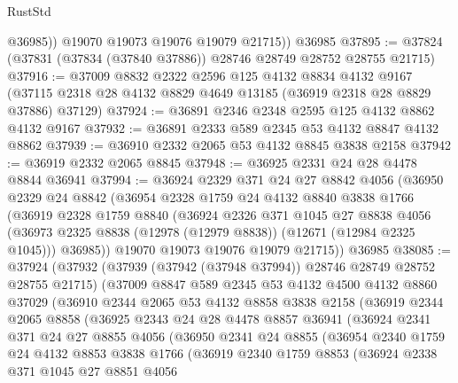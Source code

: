 \begin{lexlean}{RustStd}
\begin{coremodule}
            @36985))
        @19070
        @19073
        @19076
        @19079
        @21715))
    @36985
@37895 := @37824 (@37831 (@37834 (@37840 @37886)) @28746 @28749 @28752 @28755 @21715)
@37916 := @37009
    @8832
    @2322
    @2596
    @125
    @4132
    @8834
    @4132
    @9167
    (@37115 @2318 @28 @4132 @8829 @4649 @13185 (@36919 @2318 @28 @8829 @37886) @37129)
@37924 := @36891 @2346 @2348 @2595 @125 @4132 @8862 @4132 @9167
@37932 := @36891 @2333 @589 @2345 @53 @4132 @8847 @4132 @8862
@37939 := @36910 @2332 @2065 @53 @4132 @8845 @3838 @2158
@37942 := @36919 @2332 @2065 @8845
@37948 := @36925 @2331 @24 @28 @4478 @8844 @36941
@37994 := @36924
    @2329
    @371
    @24
    @27
    @8842
    @4056
    (@36950
      @2329
      @24
      @8842
      (@36954
        @2328
        @1759
        @24
        @4132
        @8840
        @3838
        @1766
        (@36919
          @2328
          @1759
          @8840
          (@36924
            @2326
            @371
            @1045
            @27
            @8838
            @4056
            (@36973 @2325 @8838 (@12978 (@12979 @8838)) (@12671 (@12984 @2325 @1045)))
            @36985))
        @19070
        @19073
        @19076
        @19079
        @21715))
    @36985
@38085 := @37924
    (@37932
      (@37939 (@37942 (@37948 @37994)) @28746 @28749 @28752 @28755 @21715)
      (@37009
        @8847
        @589
        @2345
        @53
        @4132
        @4500
        @4132
        @8860
        @37029
        (@36910
          @2344
          @2065
          @53
          @4132
          @8858
          @3838
          @2158
          (@36919
            @2344
            @2065
            @8858
            (@36925
              @2343
              @24
              @28
              @4478
              @8857
              @36941
              (@36924
                @2341
                @371
                @24
                @27
                @8855
                @4056
                (@36950
                  @2341
                  @24
                  @8855
                  (@36954
                    @2340
                    @1759
                    @24
                    @4132
                    @8853
                    @3838
                    @1766
                    (@36919
                      @2340
                      @1759
                      @8853
                      (@36924
                        @2338
                        @371
                        @1045
                        @27
                        @8851
                        @4056

\end{coremodule}
\end{lexlean}

